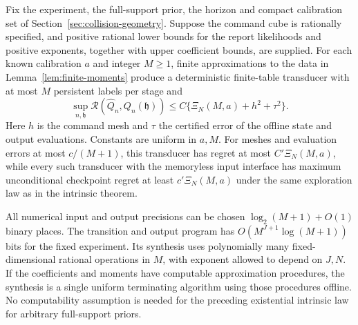 \begin{theorem}
\label{thm:digital-intrinsic}
Fix the experiment, the full-support prior, the horizon and compact
calibration set of Section~\ref{sec:collision-geometry}. Suppose the
command cube is rationally specified, and positive rational lower bounds
for the report likelihoods and positive exponents, together with upper
coefficient bounds, are supplied. For each known calibration $a$ and
integer $M\ge1$, finite approximations to the data in
Lemma~\ref{lem:finite-moments} produce a deterministic finite-table
transducer with at most $M$ persistent labels per stage and
\begin{equation}\label{eq:digital-intrinsic}
 \sup_{n,\mathfrak h}\mathcal R(\widehat Q_n,Q_n(\mathfrak h))
 \le C\{\Xi_N(M,a)+h^2+\tau^2\}.
\end{equation}
Here $h$ is the command mesh and $\tau$ the certified error of the
offline state and output evaluations. Constants are uniform in $a,M$.
For meshes and evaluation errors at most $c/(M+1)$, this transducer
has regret at most $C'\Xi_N(M,a)$, while every such transducer with the memoryless input interface has
maximum unconditional checkpoint regret at least $c'\Xi_N(M,a)$
under the same exploration law as in the intrinsic theorem.

All numerical input and output precisions can be chosen
$\log_2(M+1)+O(1)$ binary places. The transition and output program has
$O(M^{J+1}\log(M+1))$ bits for the fixed experiment. Its synthesis
uses polynomially many fixed-dimensional rational operations in $M$,
with exponent allowed to depend on $J,N$. If the coefficients and
moments have computable approximation procedures, the synthesis is a
single uniform terminating algorithm using those procedures offline.
No computability assumption is needed for the preceding existential
intrinsic law for arbitrary full-support priors.
\end{theorem}

